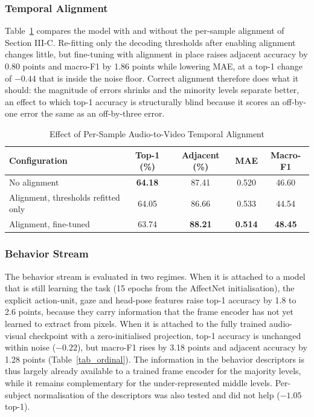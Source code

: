 \documentclass[journal]{IEEEtran}
\begin{document}
\subsubsection{Temporal Alignment}
Table~\ref{tab_align} compares the model with and without the per-sample alignment of Section III-C. Re-fitting only the decoding thresholds after enabling alignment changes little, but fine-tuning with alignment in place raises adjacent accuracy by 0.80 points and macro-F1 by 1.86 points while lowering MAE, at a top-1 change of $-0.44$ that is inside the noise floor. Correct alignment therefore does what it should: the magnitude of errors shrinks and the minority levels separate better, an effect to which top-1 accuracy is structurally blind because it scores an off-by-one error the same as an off-by-three error.

\begin{table}[!t]
\renewcommand{\arraystretch}{1.3}
\caption{Effect of Per-Sample Audio-to-Video Temporal Alignment}
\label{tab_align}
\centering
\begin{tabular}{|l|c|c|c|c|}
\hline
Configuration & Top-1 (\%) & Adjacent (\%) & MAE & Macro-F1\\
\hline
No alignment & \textbf{64.18} & 87.41 & 0.520 & 46.60\\
Alignment, thresholds refitted only & 64.05 & 86.66 & 0.533 & 44.54\\
Alignment, fine-tuned & 63.74 & \textbf{88.21} & \textbf{0.514} & \textbf{48.45}\\
\hline
\end{tabular}
\end{table}

\subsubsection{Behavior Stream}
The behavior stream is evaluated in two regimes. When it is attached to a model that is still learning the task (15 epochs from the AffectNet initialisation), the explicit action-unit, gaze and head-pose features raise top-1 accuracy by 1.8 to 2.6 points, because they carry information that the frame encoder has not yet learned to extract from pixels. When it is attached to the fully trained audio-visual checkpoint with a zero-initialised projection, top-1 accuracy is unchanged within noise ($-0.22$), but macro-F1 rises by 3.18 points and adjacent accuracy by 1.28 points (Table~\ref{tab_ordinal}). The information in the behavior descriptors is thus largely already available to a trained frame encoder for the majority levels, while it remains complementary for the under-represented middle levels. Per-subject normalisation of the descriptors was also tested and did not help ($-1.05$ top-1).
\end{document}

